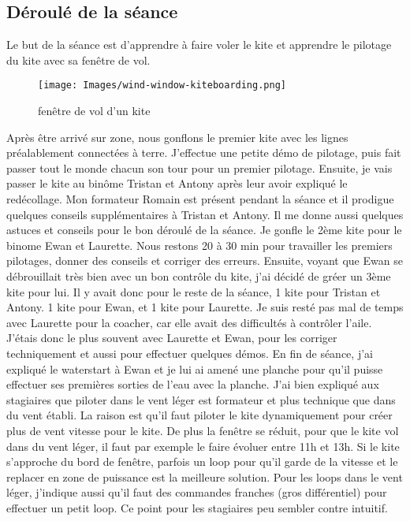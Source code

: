 \documentclass[11pt,a4paper]{report}
\begin{document}
\subsection{Déroulé de la séance}
Le but de la séance est d'apprendre à faire voler le kite et
apprendre le pilotage du kite avec sa fen\^etre de vol.
\begin{figure}
\centering
\texttt{[image: Images/wind-window-kiteboarding.png]}
\caption{fen\^etre de vol d'un kite\label{fenetre}}
\end{figure} 
Après \^etre arrivé sur zone, nous gonflons le premier kite avec les
lignes préalablement connectées à terre. J'effectue une petite démo
de pilotage, puis fait passer tout le monde chacun son tour pour
un premier pilotage.
Ensuite, je vais passer le kite au binôme Tristan et Antony après leur
avoir expliqué le redécollage. Mon formateur Romain est présent pendant la
séance et il prodigue quelques conseils supplémentaires à Tristan et Antony.
Il me donne aussi quelques astuces et conseils pour le bon déroulé de
la séance.
Je gonfle le 2ème kite pour le binome Ewan et Laurette.
Nous restons 20 à 30 min pour travailler les premiers pilotages, donner des conseils 
et corriger des erreurs.
Ensuite, voyant que Ewan se débrouillait très bien avec un bon contrôle du 
kite, j'ai décidé de gréer un 3ème kite pour lui.
Il y avait donc pour le reste de la séance, 1 kite pour Tristan et Antony.
1 kite pour Ewan, et 1 kite pour Laurette. Je suis resté pas mal de temps
avec Laurette pour la coacher, car elle avait des difficultés à contrôler l'aile.
J'étais donc le plus souvent avec Laurette et Ewan, pour les corriger techniquement 
et aussi pour effectuer quelques démos.
En fin de séance, j'ai expliqué le waterstart à Ewan et je lui ai
amené une planche pour qu'il puisse effectuer ses premières sorties
de l'eau avec la planche.
J'ai bien expliqué aux stagiaires que piloter dans le vent léger est
formateur et plus technique que dans du vent établi. La raison est qu'il faut
piloter le kite dynamiquement pour créer plus de vent vitesse pour le kite.
De plus la fen\^etre se réduit, pour que le kite vol dans du vent léger, 
il faut par exemple le faire évoluer entre 11h et 13h. Si le kite s'approche du 
bord de fen\^etre, parfois un loop pour qu'il garde de la vitesse et le replacer
en zone de puissance est la meilleure solution.
Pour les loops dans le vent léger, j'indique aussi qu'il faut
des commandes franches (gros différentiel) pour effectuer un petit loop.
Ce point pour les stagiaires peu sembler contre intuitif.
\end{document}
